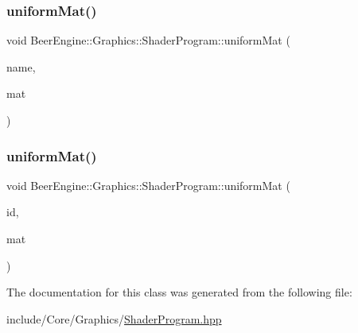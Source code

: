 \subsubsection{\texorpdfstring{uniform\+Mat()}{uniformMat()}\hspace{0.1cm}{\footnotesize\ttfamily [1/2]}}
{\footnotesize\ttfamily void Beer\+Engine\+::\+Graphics\+::\+Shader\+Program\+::uniform\+Mat (\begin{DoxyParamCaption}\item[{std\+::string const \&}]{name,  }\item[{glm\+::mat4 \&}]{mat }\end{DoxyParamCaption})}

\mbox{\label{class_beer_engine_1_1_graphics_1_1_shader_program_a0269320ff9aab4c4834f4a66d77ae028}} 
\subsubsection{\texorpdfstring{uniform\+Mat()}{uniformMat()}\hspace{0.1cm}{\footnotesize\ttfamily [2/2]}}
{\footnotesize\ttfamily void Beer\+Engine\+::\+Graphics\+::\+Shader\+Program\+::uniform\+Mat (\begin{DoxyParamCaption}\item[{G\+Lint}]{id,  }\item[{glm\+::mat4 \&}]{mat }\end{DoxyParamCaption})}



The documentation for this class was generated from the following file\+:\begin{DoxyCompactItemize}
\item 
include/\+Core/\+Graphics/\mbox{\hyperlink{_shader_program_8hpp}{Shader\+Program.\+hpp}}\end{DoxyCompactItemize}
